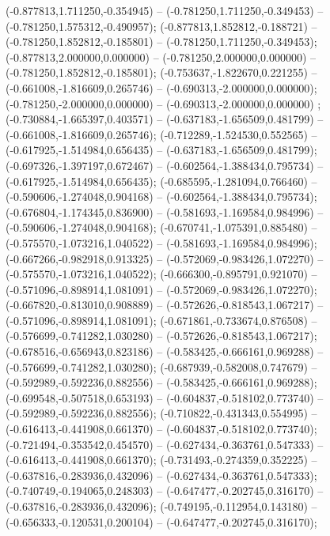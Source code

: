  (-0.877813,1.711250,-0.354945) -- (-0.781250,1.711250,-0.349453) -- (-0.781250,1.575312,-0.490957);
 (-0.877813,1.852812,-0.188721) -- (-0.781250,1.852812,-0.185801) -- (-0.781250,1.711250,-0.349453);
 (-0.877813,2.000000,0.000000) -- (-0.781250,2.000000,0.000000) -- (-0.781250,1.852812,-0.185801);
 (-0.753637,-1.822670,0.221255) -- (-0.661008,-1.816609,0.265746) -- (-0.690313,-2.000000,0.000000);
 (-0.781250,-2.000000,0.000000) -- (-0.690313,-2.000000,0.000000) ;
 (-0.730884,-1.665397,0.403571) -- (-0.637183,-1.656509,0.481799) -- (-0.661008,-1.816609,0.265746);
 (-0.712289,-1.524530,0.552565) -- (-0.617925,-1.514984,0.656435) -- (-0.637183,-1.656509,0.481799);
 (-0.697326,-1.397197,0.672467) -- (-0.602564,-1.388434,0.795734) -- (-0.617925,-1.514984,0.656435);
 (-0.685595,-1.281094,0.766460) -- (-0.590606,-1.274048,0.904168) -- (-0.602564,-1.388434,0.795734);
 (-0.676804,-1.174345,0.836900) -- (-0.581693,-1.169584,0.984996) -- (-0.590606,-1.274048,0.904168);
 (-0.670741,-1.075391,0.885480) -- (-0.575570,-1.073216,1.040522) -- (-0.581693,-1.169584,0.984996);
 (-0.667266,-0.982918,0.913325) -- (-0.572069,-0.983426,1.072270) -- (-0.575570,-1.073216,1.040522);
 (-0.666300,-0.895791,0.921070) -- (-0.571096,-0.898914,1.081091) -- (-0.572069,-0.983426,1.072270);
 (-0.667820,-0.813010,0.908889) -- (-0.572626,-0.818543,1.067217) -- (-0.571096,-0.898914,1.081091);
 (-0.671861,-0.733674,0.876508) -- (-0.576699,-0.741282,1.030280) -- (-0.572626,-0.818543,1.067217);
 (-0.678516,-0.656943,0.823186) -- (-0.583425,-0.666161,0.969288) -- (-0.576699,-0.741282,1.030280);
 (-0.687939,-0.582008,0.747679) -- (-0.592989,-0.592236,0.882556) -- (-0.583425,-0.666161,0.969288);
 (-0.699548,-0.507518,0.653193) -- (-0.604837,-0.518102,0.773740) -- (-0.592989,-0.592236,0.882556);
 (-0.710822,-0.431343,0.554995) -- (-0.616413,-0.441908,0.661370) -- (-0.604837,-0.518102,0.773740);
 (-0.721494,-0.353542,0.454570) -- (-0.627434,-0.363761,0.547333) -- (-0.616413,-0.441908,0.661370);
 (-0.731493,-0.274359,0.352225) -- (-0.637816,-0.283936,0.432096) -- (-0.627434,-0.363761,0.547333);
 (-0.740749,-0.194065,0.248303) -- (-0.647477,-0.202745,0.316170) -- (-0.637816,-0.283936,0.432096);
 (-0.749195,-0.112954,0.143180) -- (-0.656333,-0.120531,0.200104) -- (-0.647477,-0.202745,0.316170);
